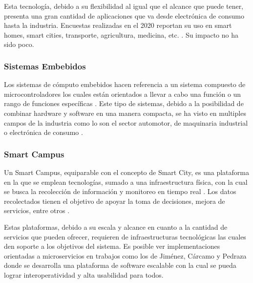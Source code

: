 \documentclass[12pt]{article}
\begin{document}
Esta tecnología, debido a su flexibilidad al igual que el alcance que puede tener, presenta una gran cantidad de aplicaciones que va desde electrónica de consumo hasta la industria. Encuestas realizadas en el 2020 reportan su uso en smart homes, smart cities, transporte, agricultura, medicina, etc. \cite{Dawood_2020}. Su impacto no ha sido poco.

\subsubsection*{Sistemas Embebidos}


Los sistemas de cómputo embebidos hacen referencia a un sistema compuesto de microcontroladores los cuales están orientados a llevar a cabo una función o un rango de funciones específicas \cite{heath2002embedded}. Este tipo de sistemas, debido a la posibilidad de combinar hardware y software en una manera compacta, se ha visto en multiples campos de la industria como lo son el sector automotor, de maquinaria industrial o electrónica de consumo \cite{deichmann_2022}.


\subsubsection*{Smart Campus}


Un Smart Campus, equiparable con el concepto de Smart City, es una plataforma en la que se emplean tecnologías, sumado a una infraestructura física, con la cual se busca la recolección de información y monitoreo en tiempo real \cite{MinAllah2020}. Los datos recolectados tienen el objetivo de apoyar la toma de decisiones, mejora de servicios, entre otros \cite{Anagnostopoulos_2023}.

Estas plataformas, debido a su escala y alcance en cuanto a la cantidad de servicios que pueden ofrecer, requieren de
infraestructuras tecnológicas las cuales den soporte a los objetivos del sistema. Es posible ver implementaciones orientadas a microservicios en trabajos como los de Jiménez, Cárcamo y Pedraza \citeyear{henry_2020} donde se desarrolla una plataforma de software escalable con la cual se pueda lograr interoperatividad y alta usabilidad para todos.
\end{document}
